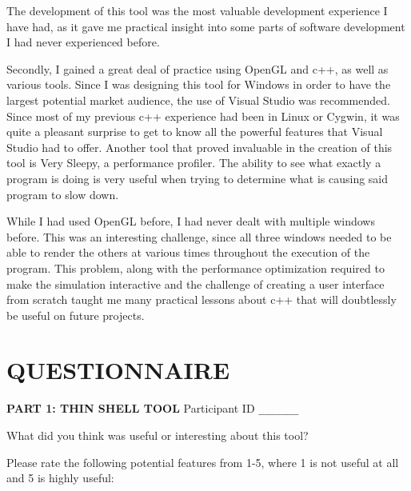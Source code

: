 \documentclass{thesis}
\begin{document}
The development of this tool was the most valuable development experience I have had, as it gave me practical insight into some
parts of software development I had never experienced before.  

Secondly, I gained a great deal of practice using OpenGL and c++, as well as various tools.  Since I was designing this tool for
Windows in order to have the largest potential market audience, the use of Visual Studio was recommended.  Since most of my
previous c++ experience had been in Linux or Cygwin, it was quite a pleasant surprise to get to know all the powerful features
that Visual Studio had to offer.  Another tool that proved invaluable in the creation of this tool is Very Sleepy, a performance
profiler.  The ability to see what exactly a program is doing is very useful when trying to determine what is causing said
program to slow down.

While I had used OpenGL before, I had never dealt with multiple windows before.  This was an interesting challenge, since all
three windows needed to be able to render the others at various times throughout the execution of the program.  This problem,
along with the performance optimization required to make the simulation interactive and the challenge of creating a user
interface from scratch taught me many practical lessons about c++ that will doubtlessly be useful on future projects.


\begin{singlespace}


\end{singlespace}

\appendix    %
\chapter{QUESTIONNAIRE}
\setlength{\parindent}{0in} 
{\bf PART 1: THIN SHELL TOOL} 
\hfill Participant ID \verb+_______+
\vspace{0.3in}

What did you think was useful or interesting about this tool?
\vspace{1.1in}

Please rate the following potential features from 1-5, where 1 is not useful at all and 5 is highly useful: \\
\end{document}
